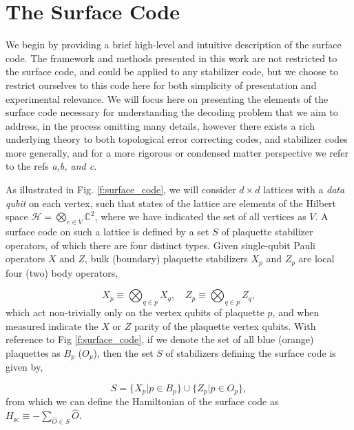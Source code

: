 \documentclass[onecolumn,preprintnumbers,amsmath,amssymb,notitlepage,nofootinbib,longbibliography,superscriptaddress]{revtex4-1}
\begin{document}
\section{The Surface Code}\label{s:the_surface_code}


    We begin by providing a brief high-level and intuitive description of the surface code. The framework and methods presented in this work are not restricted to the surface code, and could be applied to any stabilizer code, but we choose to restrict ourselves to this code here for both simplicity of presentation and experimental relevance. We will focus here on presenting the elements of the surface code necessary for understanding the decoding problem that we aim to address, in the process omitting many details, however there exists a rich underlying theory to both topological error correcting codes, and stabilizer codes more generally, and for a more rigorous or condensed matter perspective we refer to the refs \textit{a,b, and c}.

    As illustrated in Fig. \ref{f:surface_code}, we will consider $d\times d$ lattices with a \textit{data qubit} on each vertex, such that states of the lattice are elements of the Hilbert space $\mathcal{H} = \bigotimes_{v \in V}\mathbb{C}^2$, where we have indicated the set of all vertices as $V$. A surface code on such a lattice is defined by a set $S$ of plaquette stabilizer operators, of which there are four distinct types. Given single-qubit Pauli operators $X$ and $Z$, bulk (boundary) plaquette stabilizers $X_{p}$ and $Z_{p}$ are local four (two) body operators,

    \begin{equation}
        X_{p} \equiv \bigotimes_{q \in p} X_q, \quad Z_{p} \equiv \bigotimes_{q \in p} Z_q,
    \end{equation}
    which act non-trivially only on the vertex qubits of plaquette $p$, and when measured indicate the $X$ or $Z$ parity of the plaquette vertex qubits. With reference to Fig \ref{f:surface_code}, if we denote the set of all blue (orange) plaquettes as $B_p$ ($O_p$), then the set $S$ of stabilizers defining the surface code is given by,

    \begin{equation}
        S = \big\{ X_p \vert p \in B_p  \big\} \cup \big\{ Z_p \vert p \in O_p  \big\},
    \end{equation}
    from which we can define the Hamiltonian of the surface code as $H_{\mathrm{sc}} \equiv -\sum_{\hat{O} \in S}\hat{O}$. 
\end{document}
